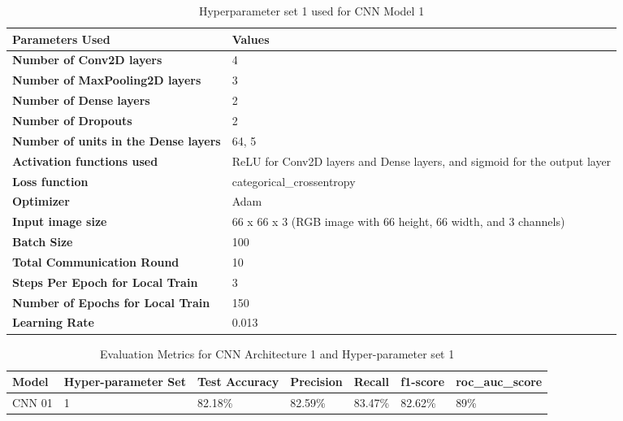 \begin{table}[!ht]
\caption{Hyperparameter set 1 used for CNN Model 1}
\centering
\begin{tabular}{p{6cm}p{6cm}}
\hline
\small \textbf{Parameters Used} & \small \textbf{Values}  \\
\hline
\small \textbf{Number of Conv2D layers} & \small 4 \\ 

\small \textbf{Number of MaxPooling2D layers} & \small 3  \\

\small \textbf{Number of Dense layers} & \small 2 \\

\small \textbf{Number of Dropouts} & \small 2 \\

\small \textbf{Number of units in the Dense layers} & \small 64, 5 \\

\small \textbf{Activation functions used} & \small ReLU for Conv2D layers and Dense layers, and sigmoid for the output layer \\ 

\small \textbf{Loss function} & \small categorical_crossentropy \\ 

\small \textbf{Optimizer} & \small Adam \\ 

\small \textbf{Input image size} & \small 66 x 66 x 3 (RGB image with 66 height, 66 width, and 3 channels) \\ 

\small \textbf{Batch Size} & \small 100 \\ 

\small \textbf{Total Communication Round} & \small 10 \\

\small \textbf{Steps Per Epoch for Local Train} & \small 3 \\ 

\small \textbf{Number of Epochs for Local Train} & \small 150 \\ 

\small \textbf{Learning Rate} & \small 0.013 \\ 
\hline
\end{tabular}
\label{table:hyperparameters}
\end{table}

\begin{table}[H]
    \caption{Evaluation Metrics for CNN Architecture 1 and Hyper-parameter set 1}
    \centering
    \begin{tabular}{|l|l|l|l|l|l|l|}
    \hline
        Model & Hyper-parameter Set & Test Accuracy & Precision & Recall & f1-score & roc\_auc\_score \\ \hline
        CNN 01 & 1 & 82.18\% & 82.59\% & 83.47\% & 82.62\% & 89\% \\ \hline
    \end{tabular}
\end{table}

